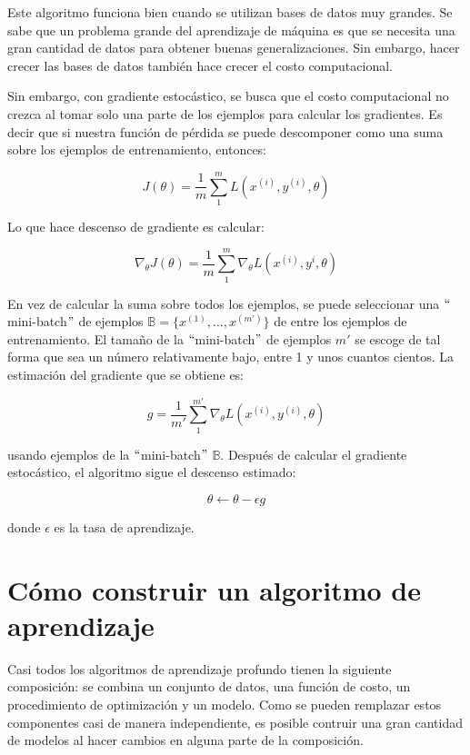 \vspace{1em}

Este algoritmo funciona bien cuando se utilizan bases de datos muy grandes. Se sabe que un problema grande del aprendizaje de máquina es que se necesita una gran cantidad de datos para obtener buenas generalizaciones. Sin embargo, hacer crecer las bases de datos también hace crecer el costo computacional.
\cite{goodfellow-et-al-2016}

\vspace{1em}

Sin embargo, con gradiente estocástico, se busca que el costo computacional no crezca al tomar solo una parte de los ejemplos para calcular los gradientes. Es decir que si nuestra función de pérdida se puede descomponer como una suma sobre los ejemplos de entrenamiento, entonces:

$$J(\theta) = \frac{1}{m}\sum_{1}^{m}L(x^{(i)},y^{(i)},\theta)$$

Lo que hace descenso de gradiente es calcular:

$$\nabla_{\theta}J(\theta) = \frac{1}{m}\sum_{1}^{m}\nabla_{\theta} L(x^{(i)},y^{i},\theta) $$

En vez de calcular la suma sobre todos los ejemplos, se puede seleccionar una $``$mini-batch$"$ de ejemplos $\mathbb{B} = \{x^{(1)}, ... , x^{(m')}\}$ de entre los ejemplos de entrenamiento. El tamaño de la $``$mini-batch$"$ de ejemplos $m'$ se escoge de tal forma que sea un número relativamente bajo, entre 1 y unos cuantos cientos. La estimación del gradiente que se obtiene es:

$$g = \frac{1}{m'}\sum_{1}^{m'}\nabla_{\theta} L(x^{(i)},y^{(i)},\theta) $$

usando ejemplos de la $``$mini-batch$"$ $\mathbb{B}$. Después de calcular el gradiente estocástico, el algoritmo sigue el descenso estimado:

$$\theta \leftarrow \theta - \epsilon g$$

donde $\epsilon$ es la tasa de aprendizaje.
\cite{goodfellow-et-al-2016}

\section{Cómo construir un algoritmo de aprendizaje}
Casi todos los algoritmos de aprendizaje profundo tienen la siguiente composición: se combina un conjunto de datos, una función de costo, un procedimiento de optimización y un modelo. Como se pueden remplazar estos componentes casi de manera independiente, es posible contruir una gran cantidad de modelos al hacer cambios en alguna parte de la composición.

